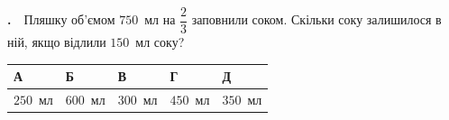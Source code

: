 \documentclass[12pt]{article}
\renewcommand{\headrulewidth}{0.4pt}
\renewcommand{\footrulewidth}{0.4pt}
\newlength{\nmtcellw}
\newcommand{\nmtSetCell}{\setlength{\nmtcellw}{\dimexpr(\linewidth-10\tabcolsep-6\arrayrulewidth)/5\relax}}
\newcommand{\answerTable}[5]{%
\par\nopagebreak\vspace{0.15cm}
\noindent\nmtSetCell
\begin{tabular}{|*{5}{>{\centering\arraybackslash}m{\nmtcellw}|}}
\hline
\rule[-0.15cm]{0pt}{0.6cm}\textbf{А} & \rule[-0.15cm]{0pt}{0.6cm}\textbf{Б} & \rule[-0.15cm]{0pt}{0.6cm}\textbf{В} & \rule[-0.15cm]{0pt}{0.6cm}\textbf{Г} & \rule[-0.15cm]{0pt}{0.6cm}\textbf{Д} \\
\hline
\rule[-0.2cm]{0pt}{0.75cm}#1 & \rule[-0.2cm]{0pt}{0.75cm}#2 & \rule[-0.2cm]{0pt}{0.75cm}#3 & \rule[-0.2cm]{0pt}{0.75cm}#4 & \rule[-0.2cm]{0pt}{0.75cm}#5 \\
\hline
\end{tabular}
\par\vspace{0.25cm}
}
\newcounter{zad}
\newcommand{\zadtask}[1]{\stepcounter{zad}\noindent\textbf{\thezad.}\ \ #1\par\nopagebreak\vspace{0.2cm}}
\newcounter{ans}
\begin{document}
\providecommand{\answerListVertical}[5]{%
    \par\nopagebreak\vspace{0.2cm}
    \begin{itemize}[itemsep=0.4cm, leftmargin=1.5cm, labelsep=0.5cm]
        \item[\textbf{А}] #1
        \item[\textbf{Б}] #2
        \item[\textbf{В}] #3
        \item[\textbf{Г}] #4
        \item[\textbf{Д}] #5
    \end{itemize}
    \vspace{0.2cm}}
\begin{samepage}
\zadtask{Пляшку об'ємом $750$~мл на $\dfrac{2}{3}$ заповнили соком. Скільки соку залишилося в ній, якщо відлили $150$~мл соку?}
\answerTable{$250$~мл}{$600$~мл}{$300$~мл}{$450$~мл}{$350$~мл}
\par{}
\end{samepage}
\endgroup

\begingroup
\renewcommand{\headrulewidth}{0.4pt}
\renewcommand{\footrulewidth}{0.4pt}
\providecommand{\hexthree}{}\renewcommand{\hexthree}[2]{%
    \draw[hexcol, line width=1.1pt]
        ($(#1,#2)+(0:30)$) -- ($(#1,#2)+(60:30)$) -- ($(#1,#2)+(120:30)$) --
        ($(#1,#2)+(180:30)$) -- ($(#1,#2)+(240:30)$) -- ($(#1,#2)+(300:30)$) -- cycle;
}
\end{document}
